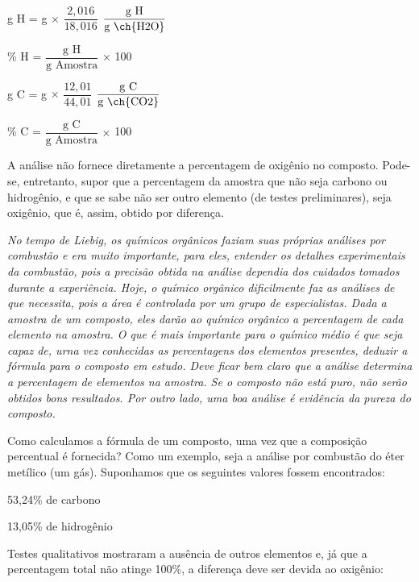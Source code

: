\begin{leftbar}[cut=false]
\begin{tightcenter}
    \footnotesize
    g H = g  $\times$ $\dfrac{2,016}{18,016}$ $\dfrac{\text{g H}}{\text{g \ch{H2O}}}$
    
    \% H = $\dfrac{\text{g H}}{\text{g Amostra}}$ $\times$ 100
    
    g C = g  $\times$ $\dfrac{12,01}{44,01}$ $\dfrac{\text{g C}}{\text{g \ch{CO2}}}$
    
    \% C = $\dfrac{\text{g C}}{\text{g Amostra}}$ $\times$ 100
\end{tightcenter}

A análise não fornece diretamente a percentagem de oxigênio no composto. Pode-se, entretanto, supor que a percentagem da amostra que não seja carbono ou hidrogênio, e que se sabe não ser outro elemento (de testes preliminares), seja oxigênio, que é, assim, obtido por diferença. 
\end{leftbar}

\par\bigskip
\noindent\emph{No tempo de Liebig, os químicos orgânicos faziam suas próprias análises por combustão e era muito importante, para eles, entender os detalhes experimentais da combustão, pois a precisão obtida na análise dependia dos cuidados tomados durante a experiência. Hoje, o químico orgânico dificilmente faz as análises de que necessita, pois a área é controlada por um grupo de especialistas. Dada a amostra de um composto, eles darão ao químico orgânico a percentagem de cada elemento na amostra. O que é mais importante para o químico médio é que seja capaz de, urna vez conhecidas as percentagens dos elementos presentes, deduzir a fórmula para o composto em estudo. Deve ficar bem claro que a análise determina a percentagem de elementos na amostra. Se o composto não está puro, não serão obtidos bons resultados. Por outro lado, uma boa análise é evidência da pureza do composto.}
\par\bigskip

Como calculamos a fórmula de um composto, uma vez que a composição percentual é fornecida? Como um exemplo, seja a análise por combustão do éter metílico (um gás). Suponhamos que os seguintes valores fossem encontrados:

\begin{tightcenter}
53,24\% de carbono

13,05\% de hidrogênio
\end{tightcenter}

Testes qualitativos mostraram a ausência de outros elementos e, já que a percentagem total não atinge 100\%, a diferença deve ser devida ao oxigênio: 

